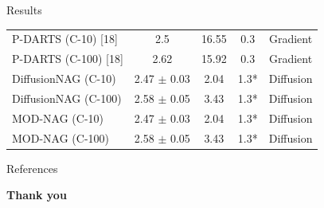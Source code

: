 \documentclass[aspectratio=169,xcolor=dvipsnames]{beamer}
\begin{document}
\begin{frame}{Results}
\begin{table}[h]
\begin{tabular}{lcccc}
            P-DARTS (C-10) {[}18{]}         & 2.5                     & 16.55                & 0.3                             & Gradient               \\
            P-DARTS (C-100) {[}18{]}        & 2.62                    & 15.92                & 0.3                             & Gradient               \\
            DiffusionNAG (C-10)             & 2.47 $\pm$ 0.03         & 2.04                 & 1.3*                            & Diffusion                     \\
            DiffusionNAG (C-100)            & 2.58 $\pm$ 0.05         & 3.43                 & 1.3*                            & Diffusion                     \\
            MOD-NAG (C-10)                  & 2.47 $\pm$ 0.03         & 2.04                 & 1.3*                            & Diffusion                     \\
            MOD-NAG (C-100)                 & 2.58 $\pm$ 0.05         & 3.43                 & 1.3*                            & Diffusion                     \\
        \end{tabular}
    \end{table}
    \nocite{2023arXiv230516943A}
    \nocite{DBLP:journals/corr/abs-1807-11626}
    \nocite{DBLP:journals/corr/abs-1812-00332}
    \nocite{white2023neural}
\end{frame}

\begin{frame}{References}
    \printbibliography[heading=none]
\end{frame}


\begin{frame}
    \Huge{\centerline{\textbf{Thank you}}}
\end{frame}

\end{document}
